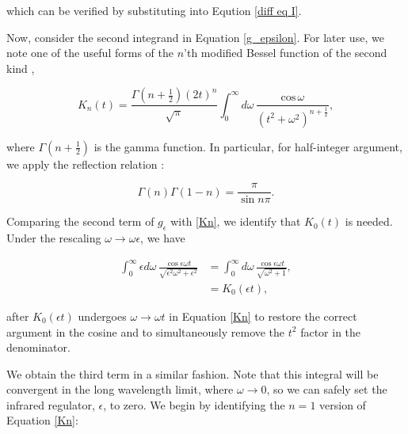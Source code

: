 \documentclass{article}
\numberwithin{equation}{section} %
\begin{document}
\noindent which can be verified by substituting into Eqution \ref{diff eq I}.

Now, consider the second integrand in Equation \ref{g_epsilon}. For later use, we note one of the useful forms of the $n$'th modified Bessel function of the second kind \cite{bessel},

%



\begin{equation}
K_n(t) = \frac{\Gamma(n+\frac{1}{2})(2t)^n}{\sqrt{\pi}}\int^\infty_0 d\omega \, \frac{\mathrm{cos \,} \omega}{(t^2 + \omega^2)^{n+\frac{1}{2}}},
\label{Kn}
\end{equation}

\noindent where $\Gamma(n+\frac{1}{2})$ is the gamma function. In particular, for half-integer argument, we apply the reflection relation \cite{reflection}:

\begin{equation}
\Gamma(n)\Gamma(1-n) = \frac{\pi}{\sin n\pi}.
\end{equation}

Comparing the second term of $g_\epsilon$ with \ref{Kn}, we identify that $K_0(t)$ is needed. Under the rescaling $\omega \rightarrow \omega\epsilon$, we have

\begin{equation}
\begin{split}
\int^\infty_0 \epsilon d\omega \, \frac{\cos \epsilon\omega t}{\sqrt{\epsilon^2\omega^2 + \epsilon^2}} & = \int^\infty_0 d\omega \, \frac{\cos \epsilon\omega t}{\sqrt{\omega^2 + 1}},\\
&= K_0(\epsilon t),
\end{split}
\end{equation}

\noindent after $K_0(\epsilon t)$ undergoes $\omega \rightarrow \omega t$ in Equation \ref{Kn} to restore the correct argument in the cosine and to simultaneously remove the $t^2$ factor in the denominator.

We obtain the third term in a similar fashion. Note that this integral will be convergent in the long wavelength limit, where $\omega\rightarrow 0$, so we can safely set the infrared regulator, $\epsilon$, to zero. We begin by identifying the $n=1$ version of Equation \ref{Kn}:
\end{document}
